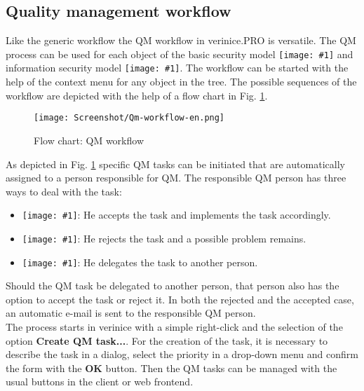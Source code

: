 \documentclass[a4paper,10pt]{book}
\newcommand{\icon}[1]{\texttt{[image: \#1]}}
\begin{document}
\subsection{Quality management workflow}
Like the generic workflow the QM workflow in verinice.\textsc{PRO} is versatile.
The QM process can be used for each object of the basic security model
\icon{Icon/GS_Modell.png} and information security model  \icon{Icon/Informationssicherheitsmodell.png}.
The workflow can be started with the help of the context menu for any object in the tree.
The possible sequences of the workflow are depicted with the help of a flow chart in Fig. \ref{Flow chart: QM workflow}.
\begin{figure}[htb!]
  \centering
  \texttt{[image: Screenshot/Qm-workflow-en.png]}
  \caption{\label{Flow chart: QM workflow} Flow chart: QM workflow}
\end{figure}
As depicted in Fig. \ref{Flow chart: QM workflow} specific QM tasks can be initiated that are automatically assigned to a person responsible for QM. The responsible QM person has three ways to deal with the task:
\begin{itemize}
\item \icon{Icon/Akzeptieren-en.png}: He accepts the task and implements the task accordingly.
\item \icon{Icon/Ablehnen-en.png}: He rejects the task and a possible problem remains.
\item \icon{Icon/waehle_person-en.png}: He delegates the task to another person.
\end{itemize}
Should the QM task be delegated to another person, that person also has the option to accept the task or reject it. In both the rejected and the accepted case, an automatic e-mail is sent to the responsible QM person.
\newline\\
The process starts in verinice with a simple right-click and the selection of the option \textbf{Create QM task...}.
For the creation of the task, it is necessary to describe the task in a dialog, select the priority in a drop-down menu and confirm the form with the \textbf{OK} button.
Then the QM tasks can be managed with the usual buttons in the client or web frontend.
\end{document}
